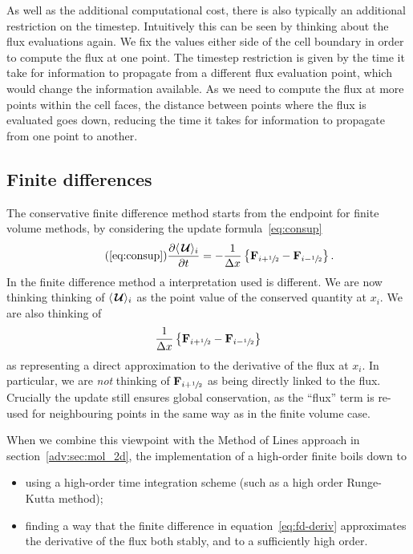 As well as the additional computational cost, there is also typically an
additional restriction on the timestep. Intuitively this can be seen by
thinking about the flux evaluations again. We fix the values either side of the
cell boundary in order to compute the flux at one point.  The timestep
restriction is given by the time it take for information to propagate from a
different flux evaluation point, which would change the information available.
As we need to compute the flux at more points within the cell faces, the
distance between points where the flux is evaluated goes down, reducing the
time it takes for information to propagate from one point to another.

\subsection{Finite differences}

The conservative finite difference method starts from the endpoint for finite
volume methods, by considering the update formula~\eqref{eq:consup}
\begin{equation}
\tag{\ref{eq:consup}}
\frac{\partial \langle \Uc\rangle_{i}}{\partial t} =
  - \frac{1}{\Delta x} \left \{ \Fb_{i+\myhalf} -
                                \Fb_{i-\myhalf} \right \}.
\end{equation}
In the finite difference method a interpretation used is different. We are now
thinking thinking of $\langle {\,\boldsymbol{\mathcal{U}}}\rangle_{i}$ as the point value of the
conserved quantity at $x_i$. We are also thinking of
\begin{equation}
  \label{eq:fd-deriv}
  \frac{1}{\Delta x} \left \{ {\bf F}_{i+{\sfrac{1}{2}}} -
                                {\bf F}_{i-{\sfrac{1}{2}}} \right \}
\end{equation}
as representing a direct approximation to the derivative of the flux at $x_i$.
In particular, we are \emph{not} thinking of ${\bf F}_{i+{\sfrac{1}{2}}}$ as being
directly linked to the flux. Crucially the update still ensures global
conservation, as the ``flux'' term is re-used for neighbouring points in the
same way as in the finite volume case.

When we combine this viewpoint with the Method of Lines approach in
section~\ref{adv:sec:mol_2d}, the implementation of a high-order finite boils
down to
\begin{itemize}
  \item using a high-order time integration scheme (such as a high order
  Runge-Kutta method);
  \item finding a way that the finite difference in equation~\eqref{eq:fd-deriv}
  approximates the derivative of the flux both stably, and to a sufficiently
  high order.
\end{itemize}

